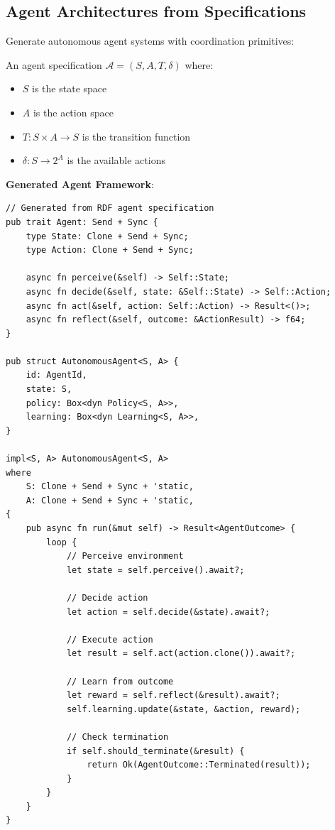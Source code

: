 \subsection{Agent Architectures from Specifications}

Generate autonomous agent systems with coordination primitives:

\begin{definition}
    An agent specification $\mathcal{A} = (S, A, T, \delta)$ where:
    \begin{itemize}
        \item $S$ is the state space
        \item $A$ is the action space
        \item $T: S \times A \rightarrow S$ is the transition function
        \item $\delta: S \rightarrow 2^A$ is the available actions
    \end{itemize}
\end{definition}

\textbf{Generated Agent Framework}:

\begin{verbatim}
// Generated from RDF agent specification
pub trait Agent: Send + Sync {
    type State: Clone + Send + Sync;
    type Action: Clone + Send + Sync;

    async fn perceive(&self) -> Self::State;
    async fn decide(&self, state: &Self::State) -> Self::Action;
    async fn act(&self, action: Self::Action) -> Result<()>;
    async fn reflect(&self, outcome: &ActionResult) -> f64;
}

pub struct AutonomousAgent<S, A> {
    id: AgentId,
    state: S,
    policy: Box<dyn Policy<S, A>>,
    learning: Box<dyn Learning<S, A>>,
}

impl<S, A> AutonomousAgent<S, A>
where
    S: Clone + Send + Sync + 'static,
    A: Clone + Send + Sync + 'static,
{
    pub async fn run(&mut self) -> Result<AgentOutcome> {
        loop {
            // Perceive environment
            let state = self.perceive().await?;

            // Decide action
            let action = self.decide(&state).await?;

            // Execute action
            let result = self.act(action.clone()).await?;

            // Learn from outcome
            let reward = self.reflect(&result).await?;
            self.learning.update(&state, &action, reward);

            // Check termination
            if self.should_terminate(&result) {
                return Ok(AgentOutcome::Terminated(result));
            }
        }
    }
}
\end{verbatim}

